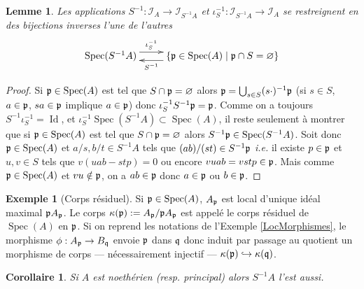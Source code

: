 \documentclass[a4paper, oneside, 12pt]{book}
\theoremstyle{theoremeStyle} %
\newtheorem{lemme}[theoreme]{Lemme}
\newtheorem{corollaire}[theoreme]{Corollaire}
\theoremstyle{definition} %
\newtheorem{exemple}[theoreme]{Exemple}
\newcommand{\ie}{\textit{i.e.}} %
\DeclareMathOperator{\Spec}{Spec}
\DeclareMathOperator{\Id}{Id}
\begin{document}
\begin{lemme}Les applications $S^{-1}: \mathcal{I}_A \rightarrow  \mathcal{I}_{S^{-1}A}  $ et  $\iota_S^{-1}: \mathcal{I}_{S^{-1}A} \rightarrow \mathcal{I}_A $ se restreignent en des bijections inverses l'une de l'autres
$$\xymatrix{\Spec(S^{-1}A) \ar@<1ex>[r]^-{\iota_S^{-1}}& \lbrace \frak{p}\in \Spec(A)\;|\; \frak{p}\cap S=\varnothing\rbrace \ar@<1ex>[l]^-{S^{-1}} }$$\end{lemme}
\begin{proof} Si $\frak{p}\in \Spec(A)$ est tel que $S\cap \frak{p}=\varnothing$ alors $\frak{p}=\bigcup_{s\in S}(s\cdot)^{-1}\frak{p}$ (si $s\in S$, $a\in \frak{p}$, $sa\in\frak{p}$ implique $a\in\frak{p}$) donc   $\iota_S^{-1}S^{-1}\frak{p}=\frak{p}$. Comme on a toujours $S^{-1}\iota_S^{-1}=\Id$, et $\iota_S^{-1}\Spec(S^{-1}A)\subset \Spec(A)$, il reste seulement à montrer que si $\frak{p}\in \Spec(A)$ est tel que $S\cap \frak{p}=\varnothing$ alors  $S^{-1}\frak{p}\in \Spec(S^{-1}A)$. Soit donc $\frak{p}\in \Spec(A)$ et $a/s,b/t\in S^{-1}A$ tels que $(ab)/(st)\in S^{-1}\frak{p}$ \ie{} il existe $p\in \frak{p}$ et $u,v\in S$ tels que $v(uab-stp)=0$ ou encore $vuab=vstp\in\frak{p}$. Mais comme $\frak{p}\in \Spec(A)$ et $vu\notin\frak{p}$, on a $ab\in\frak{p}$ donc $a\in\frak{p}$ ou $b\in\frak{p}$.   \end{proof}

	\begin{exemple}[Corps résiduel] Si $\frak{p}\in \Spec(A)$,  $A_{\frak{p}}$ est local d'unique idéal maximal $\frak{p}A_{\frak{p}}$. Le corps $\kappa(\frak{p}):=A_{\frak{p}}/\frak{p}A_{\frak{p}}$ est appelé le corps résiduel de $\Spec(A)$ en $\frak{p}$. Si on reprend les notations de l'Exemple \ref{LocMorphismes}, le morphisme $\phi:A_{\frak{p}}\rightarrow B_{\frak{q}}$ envoie $\frak{p}$ dans $\frak{q}$ donc induit par passage au quotient un morphisme de corps --- nécessairement injectif --- $\kappa(\frak{p})\hookrightarrow \kappa(\frak{q})$.\end{exemple}


	\begin{corollaire}Si $A$ est noethérien (resp. principal) alors $S^{-1}A$ l'est aussi.\end{corollaire}
\end{document}
